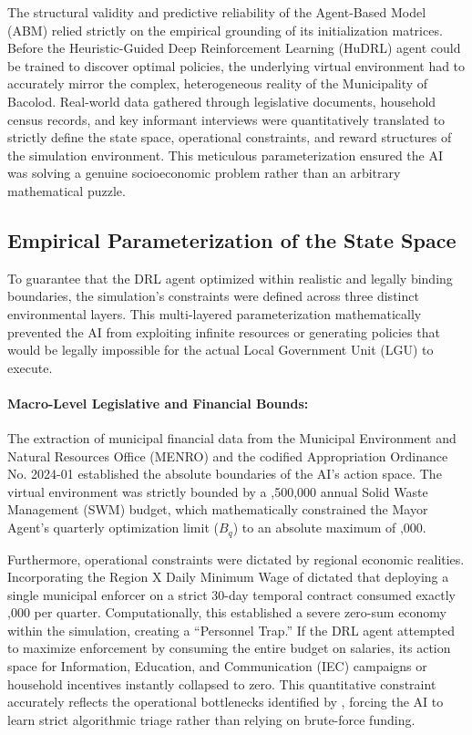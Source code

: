 The structural validity and predictive reliability of the Agent-Based Model (ABM) relied strictly on the empirical grounding of its initialization matrices. Before the Heuristic-Guided Deep Reinforcement Learning (HuDRL) agent could be trained to discover optimal policies, the underlying virtual environment had to accurately mirror the complex, heterogeneous reality of the Municipality of Bacolod. Real-world data gathered through legislative documents, household census records, and key informant interviews were quantitatively translated to strictly define the state space, operational constraints, and reward structures of the simulation environment. This meticulous parameterization ensured the AI was solving a genuine socioeconomic problem rather than an arbitrary mathematical puzzle.

\subsection{Empirical Parameterization of the State Space}

To guarantee that the DRL agent optimized within realistic and legally binding boundaries, the simulation's constraints were defined across three distinct environmental layers. This multi-layered parameterization mathematically prevented the AI from exploiting infinite resources or generating policies that would be legally impossible for the actual Local Government Unit (LGU) to execute.

\paragraph{Macro-Level Legislative and Financial Bounds:}
The extraction of municipal financial data from the Municipal Environment and Natural Resources Office (MENRO) and the codified Appropriation Ordinance No. 2024-01 established the absolute boundaries of the AI's action space. The virtual environment was strictly bounded by a ,500,000 annual Solid Waste Management (SWM) budget, which mathematically constrained the Mayor Agent's quarterly optimization limit ($B_q$) to an absolute maximum of ,000. 

Furthermore, operational constraints were dictated by regional economic realities. Incorporating the Region X Daily Minimum Wage of  dictated that deploying a single municipal enforcer on a strict 30-day temporal contract consumed exactly ,000 per quarter. Computationally, this established a severe zero-sum economy within the simulation, creating a ``Personnel Trap.'' If the DRL agent attempted to maximize enforcement by consuming the entire budget on salaries, its action space for Information, Education, and Communication (IEC) campaigns or household incentives instantly collapsed to zero. This quantitative constraint accurately reflects the operational bottlenecks identified by \cite{Nishimura2022}, forcing the AI to learn strict algorithmic triage rather than relying on brute-force funding.

